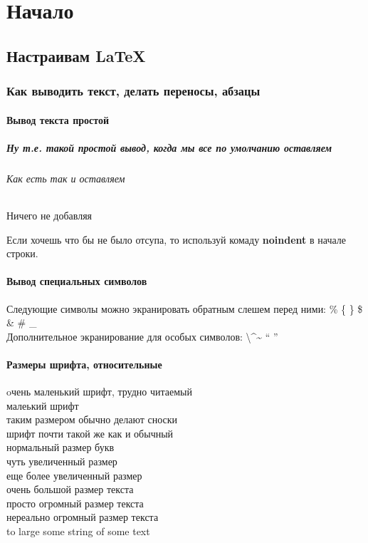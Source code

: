 \documentclass[oneside,final,14pt]{extreport}
\begin{document}
\part{Начало}
\chapter{Настраивам LaTeX}
\section{Как выводить текст, делать переносы, абзацы}
\subsection{Вывод текста простой}
\subsubsection{Ну т.е. такой простой вывод, когда мы все по умолчанию оставляем}
\paragraph{Как есть так и оставляем}
\subparagraph{Ничего не добавляя}
Если хочешь что бы не было отсупа, то используй комаду
\textbf{noindent} в начале строки.\newline
\subsection{Вывод специальных символов}
Следующие символы можно экранировать обратным слешем
перед ними: \% \{ \} \$ \& \# \_ \\
Дополнительное экранирование для особых
символов: \textbackslash  \textasciicircum \~{}  `` '' \\

\subsection{Размеры шрифта, относительные}
\tiny oчень маленький шрифт, трудно читаемый \\
\scriptsize малеький шрифт \\
\footnotesize таким размером обычно делают сноски \\
\small шрифт почти такой же как и обычный \\
\normalsize нормальный размер букв \\
\large чуть увеличенный размер \\
\Large еще более увеличенный размер \\
\LARGE очень большой размер текста \\
\huge просто огромный размер текста \\
\Huge нереально огромный размер текста \\
\Huge to large some string of some text \\
\normalsize
\end{document}
